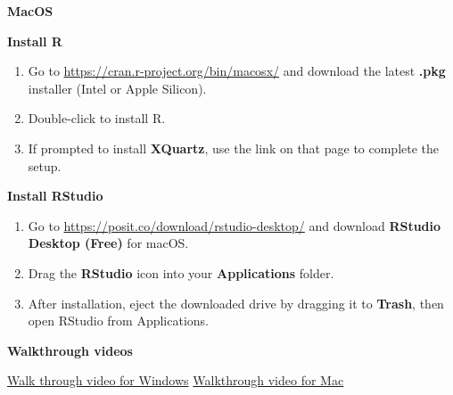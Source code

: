 \documentclass[
  letterpaper,
  DIV=11,
  numbers=noendperiod,
  oneside]{scrreprt}
\providecommand{\tightlist}{%
  \setlength{\itemsep}{0pt}\setlength{\parskip}{0pt}}\usepackage{longtable,booktabs,array}
\begin{document}
\begin{tcolorbox}[enhanced jigsaw, rightrule=.15mm, arc=.35mm, bottomrule=.15mm, leftrule=.75mm, breakable, colframe=quarto-callout-warning-color-frame, left=2mm, toprule=.15mm, opacityback=0, colback=white]

\vspace{-3mm}\textbf{MacOS}\vspace{3mm}

\textbf{Install R}

\begin{enumerate}
\def\labelenumi{\arabic{enumi}.}
\tightlist
\item
  Go to \url{https://cran.r-project.org/bin/macosx/} and download the
  latest \textbf{.pkg} installer (Intel or Apple Silicon).
\item
  Double-click to install R.
\item
  If prompted to install \textbf{XQuartz}, use the link on that page to
  complete the setup.
\end{enumerate}

\textbf{Install RStudio}

\begin{enumerate}
\def\labelenumi{\arabic{enumi}.}
\tightlist
\item
  Go to \url{https://posit.co/download/rstudio-desktop/} and download
  \textbf{RStudio Desktop (Free)} for macOS.
\item
  Drag the \textbf{RStudio} icon into your \textbf{Applications} folder.
\item
  After installation, eject the downloaded drive by dragging it to
  \textbf{Trash}, then open RStudio from Applications.
\end{enumerate}

\end{tcolorbox}

\begin{tcolorbox}[enhanced jigsaw, rightrule=.15mm, arc=.35mm, bottomrule=.15mm, leftrule=.75mm, breakable, colframe=quarto-callout-warning-color-frame, left=2mm, toprule=.15mm, opacityback=0, colback=white]

\vspace{-3mm}\textbf{Walkthrough videos}\vspace{3mm}

\href{https://youtu.be/KAeHFzxbHTA?si=xpeDGqt7gurg_rFR}{Walk through
video for Windows}
\href{https://youtu.be/ay25o485YXs?si=7r4qmmvtD15RM_eS}{Walkthrough
video for Mac}

\end{tcolorbox}
\end{document}
